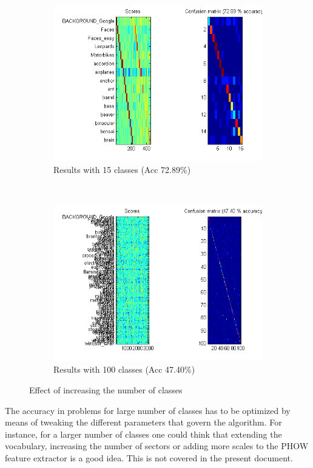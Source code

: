 \begin{figure}[htb]
	\begin{subfigure}[t]{0.4\textwidth}
		\includegraphics[width=\textwidth]{./img/ex1/eval-15-classes.png}
		\caption{Results with 15 classes (Acc 72.89\%)}
	\end{subfigure}
	~
	\begin{subfigure}[t]{0.4\textwidth}
		\includegraphics[width=\textwidth]{./img/ex1/eval-100-classes.png}
		\caption{Results with 100 classes (Acc 47.40\%)}
	\end{subfigure}
\caption{Effect of increasing the number of classes}
\label{fig:effect-classes}
\end{figure}

The accuracy in problems for large number of classes has to be optimized by means of tweaking the different parameters that govern the algorithm. For instance, for a larger number of classes one could think that extending the vocabulary, increasing the number of sectors or adding more scales to the PHOW feature extractor is a good idea. This is not covered in the present document.